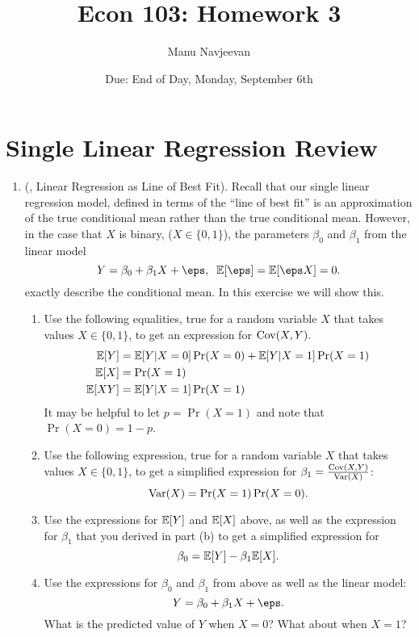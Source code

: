 \documentclass[10pt]{article}
\title{Econ 103: Homework 3}%
\author{Manu Navjeevan}
\date{Due: End of Day, Monday, September 6th}
\begin{document}
\maketitle

\section*{Single Linear Regression Review}%
\begin{enumerate}
	\item (, Linear Regression as Line of Best Fit). Recall that our single linear regression model, defined in terms of the ``line of best fit'' is an approximation of the true conditional mean rather than the true conditional mean. However, in the case that \(X\) is binary, (\(X \in \{0,1\}\)), the parameters  \(\beta_0\) and  \(\beta_1\) from the linear model
	\[
		Y = \beta_0 + \beta_1X + \eps,\;\;\E[\eps] = \E[\eps X] = 0
	.\] 
	exactly describe the conditional mean. In this exercise we will show this. 	
	\begin{enumerate}
		\item Use the following equalities, true for a random variable \(X\) that takes values  \(X\in \{0,1\}\), to get an expression for \(\operatorname{Cov}(X,Y).\)
		\begin{align*}
			\mathbb{E}[Y] &= \mathbb{E}[Y|X=0]\Pr(X=0) + \mathbb{E}[Y|X=1]\Pr(X=1)\\
			\mathbb{E}[X] &= \Pr(X=1) \\
			\mathbb{E}[XY] &= \mathbb{E}[Y|X=1]\Pr(X=1)
		\end{align*}
		It may be helpful to let \(p = \Pr(X=1)\) and note that  \(\Pr(X=0) = 1-p\).
		\item Use the following expression, true for a random variable \(X\) that takes values  \(X\in \{0,1\}\), to get a simplified expression for \(\beta_1 = \frac{\operatorname{Cov}(X,Y)}{\operatorname{Var}(X)}\):
		\[
			\operatorname{Var}(X) = \Pr(X=1)\Pr(X=0) 
		 .\] 
		\item Use the expressions for \(\mathbb{E}[Y]\) and \(\mathbb{E}[X]\) above, as well as the expression for \(\beta_1\) that you derived in part (b) to get a simplified expression for 
		\[
			\beta_0 = \mathbb{E}[Y] - \beta_1\mathbb{E}[X]
		.\] 
		\item Use the expressions for \(\beta_0\) and  \(\beta_1\) from above as well as the linear model:
		 \[
			 Y = \beta_0 + \beta_1X + \eps
		 .\] 
		 What is the predicted value of \(Y\) when  \(X=0\)? What about when  \(X=1\)?
	\end{enumerate}
\end{enumerate}
\end{document}
